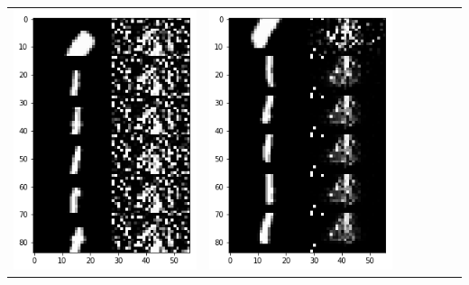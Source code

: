 \documentclass[12pt]{report} %
\begin{document}
\begin{tabular}{m{0.7cm}m{2.4cm}m{2.4cm}m{2.4cm}m{2.4cm}m{2.4cm}m{2.4cm}}
	\includegraphics[scale=0.3]{pictures/M2_1_up.png} & \includegraphics[scale=0.3]{pictures/M2_1_down.png}\\

\end{tabular}
\end{document}

